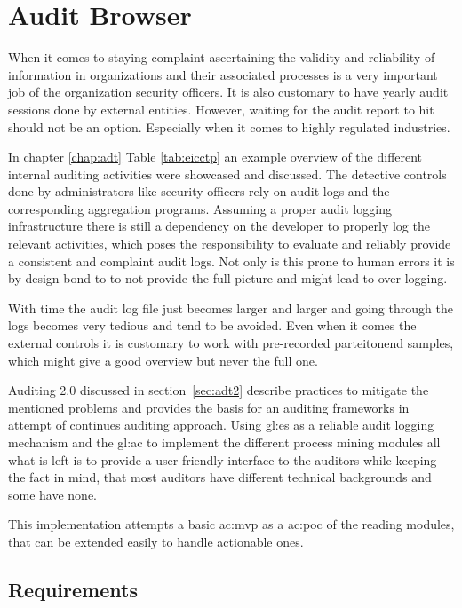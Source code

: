 %
\chapter{Audit Browser}\label{chap:ab}

When it comes to staying complaint ascertaining the validity and reliability of information in organizations and their associated processes is a very important job of the organization security officers. It is also customary to have yearly audit sessions done by external entities. However, waiting for the audit report to hit should not be an option. Especially when it comes to highly regulated industries.

In chapter \ref{chap:adt} Table \ref{tab:eicctp} an example overview of the different internal auditing activities were showcased and discussed. The detective controls done by administrators like security officers rely on audit logs and the corresponding aggregation programs. Assuming a proper audit logging infrastructure there is still a dependency on the developer to properly log the relevant activities, which poses the responsibility to evaluate and reliably provide a consistent and complaint audit logs. Not only is this prone to human errors it is by design bond to to not provide the full picture and might lead to over logging. 

With time the audit log file just becomes larger and larger and going through the logs becomes very tedious and tend to be avoided. Even when it comes the external controls it is customary to work with pre-recorded parteitonend samples, which might give a good overview but never the full one. 

Auditing 2.0 discussed in section~\ref{sec:adt2} describe practices to mitigate the mentioned problems and provides the basis for an auditing frameworks in attempt of continues auditing approach. Using \gls{gl:es} as a reliable audit logging mechanism and the \gls{gl:ac} to implement the different process mining modules all what is left is to provide a user friendly interface to the auditors while keeping the fact in mind, that most auditors have different technical backgrounds and some have none.

This implementation attempts a basic \gls{ac:mvp} as a \gls{ac:poc} of the reading modules, that can be extended easily to handle actionable ones.

\section{Requirements}

